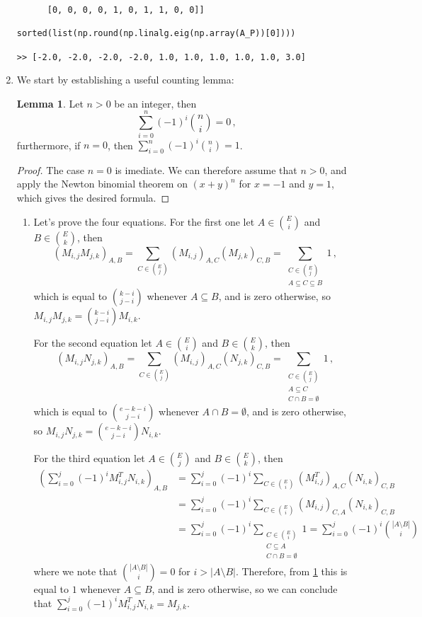 \documentclass[kulak]{tplt}
\theoremstyle{definition}
\newtheorem{lm}[thm]{Lemma}
\begin{document}
\begin{enumerate}
\begin{verbatim}
      [0, 0, 0, 0, 1, 0, 1, 1, 0, 0]]

sorted(list(np.round(np.linalg.eig(np.array(A_P))[0])))

>> [-2.0, -2.0, -2.0, -2.0, 1.0, 1.0, 1.0, 1.0, 1.0, 3.0]
\end{verbatim}

\item 
We start by establishing a useful counting lemma:
\begin{lm}\label{lm:binsum}
Let $n> 0$ be an integer, then
$$ \sum_{i=0}^n (-1)^i\binom{n}{i} = 0 \, ,$$
furthermore, if $n=0$, then $\sum_{i=0}^n (-1)^i\binom{n}{i} = 1$.
\end{lm}

\begin{proof}
The case $n=0$ is imediate.
We can therefore assume that $n>0$, and apply the Newton binomial theorem on $(x+y)^n$ for $x = -1$ and $y = 1$, which gives the desired formula. 
\end{proof}

\begin{enumerate}
\item 
Let's prove the four equations.
For the first one let $A \in \binom{E}{i}$ and $B \in \binom{E}{k}$, then
$$(M_{i, j} M_{j, k})_{A, B} = \sum_{C \in \binom{E}{j}} (M_{i, j})_{A, C}( M_{j, k})_{C, B} = \sum_{\substack{C \in \binom{E}{j} \\ A \subseteq C \subseteq B }} 1\, ,$$
which is equal to $\binom{k-i}{j-i}$ whenever $A\subseteq B$, and is zero otherwise, so
$M_{i, j} M_{j, k} = \binom{k-i}{j-i}M_{i, k}$.

For the second equation let $A \in \binom{E}{i}$ and $B \in \binom{E}{k}$, then
$$(M_{i, j} N_{j, k})_{A, B} = \sum_{C \in \binom{E}{j}} (M_{i, j})_{A, C}( N_{j, k})_{C, B} = \sum_{\substack{C \in \binom{E}{j} \\ A \subseteq C \\ C \cap B = \emptyset }} 1 \, ,
$$
which is equal to $\binom{e-k-i}{j-i}$ whenever $A\cap B = \emptyset $, and is zero otherwise, so
$M_{i, j} N_{j, k} = \binom{e-k-i}{j-i}N_{i, k}$.

For the third equation let $A \in \binom{E}{j}$ and $B \in \binom{E}{k}$, then
\begin{align*}
\left(\sum_{i=0}^j (-1)^i M_{i, j}^T N_{i, k}\right)_{A, B} &= \sum_{i=0}^j (-1)^i \sum_{C \in \binom{E}{i}} (M_{i, j}^T)_{A, C}( N_{i, k})_{C, B}\\
&=\sum_{i=0}^j (-1)^i \sum_{C \in \binom{E}{i}} (M_{i, j})_{C, A}( N_{i, k})_{C, B}\\
&=\sum_{i=0}^j (-1)^i \sum_{\substack{C \in \binom{E}{i}\\ C \subseteq A \\ C \cap B = \emptyset  }} 1 =\sum_{i=0}^j (-1)^i \binom{|A \setminus B|}{i}
\end{align*}
where we note that $\binom{|A \setminus B|}{i} = 0 $ for $i > |A \setminus B|$.
Therefore, from \cref{lm:binsum} this is equal to $1$ whenever $A \subseteq B $, and is zero otherwise, so we can conclude that
$\sum_{i=0}^j (-1)^i M_{i, j}^T N_{i, k} = M_{j, k}$.



\end{enumerate}
\end{enumerate}
\end{document}
